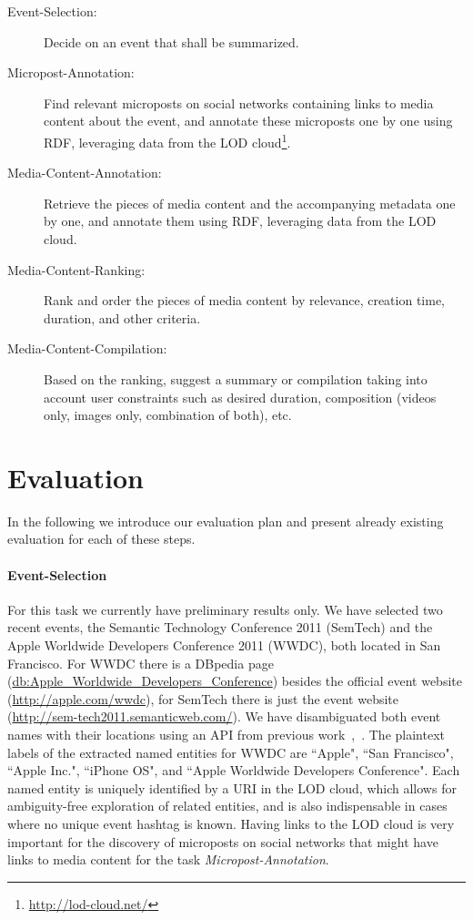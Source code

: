 \documentclass[runningheads,a4paper]{llncs}
\begin{document}
\begin{description}
\item [Event-Selection:] Decide on an event that shall be summarized.
\item [Micropost-Annotation:] Find relevant microposts on social networks containing links to media content about the event, and annotate these microposts one by one using RDF, leveraging data from the LOD cloud\footnote{\url{http://lod-cloud.net/}}.
\item [Media-Content-Annotation:] Retrieve the pieces of media content and the accompanying metadata one by one, and annotate them using RDF, leveraging data from the LOD cloud.
\item [Media-Content-Ranking:] Rank and order the pieces of media content by relevance, creation time, duration, and other criteria.
\item [Media-Content-Compilation:] Based on the ranking, suggest a summary or compilation taking into account user constraints such as desired duration, composition (videos only, images only, combination of both), etc.
\end{description}

\section{Evaluation}
In the following we introduce our evaluation plan and present already existing evaluation for each of these steps.

\paragraph{\bf{Event-Selection}}
For this task we currently have preliminary results only. We have selected two recent events, the Semantic Technology Conference 2011 (SemTech) and the Apple Worldwide Developers Conference 2011 (WWDC), both located in San Francisco. For WWDC there is a DBpedia page (\url{db:Apple_Worldwide_Developers_Conference}) besides the official event website (\url{http://apple.com/wwdc}), for SemTech there is just the event website (\url{http://sem-tech2011.semanticweb.com/}). We have disambiguated both event names with their locations using an API from previous work~\cite{semwebvid},~\cite{twittertrends}. The plaintext labels of the extracted named entities for WWDC are ``Apple", ``San Francisco", ``Apple Inc.", ``iPhone OS", and ``Apple Worldwide Developers Conference". Each named entity is uniquely identified by a URI in the LOD cloud, which allows for ambiguity-free exploration of related entities, and is also indispensable in cases where no unique event hashtag is known. Having links to the LOD cloud is very important for the discovery of microposts on social networks that might have links to media content for the task \emph{Micropost-Annotation}.
\end{document}
